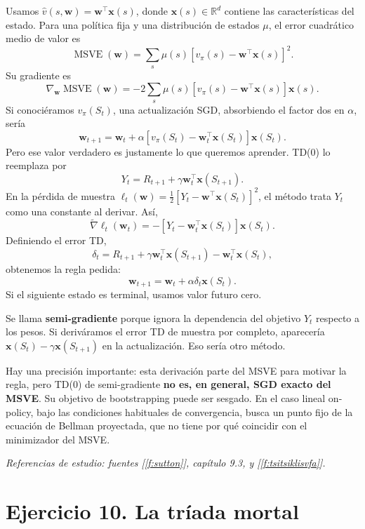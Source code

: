 \documentclass[11pt,a4paper]{article}
\newcommand{\R}{\mathbb{R}}
\begin{document}
Usamos $\widehat v(s,\mathbf w)=\mathbf w^\top\mathbf x(s)$, donde $\mathbf x(s)\in\R^d$ contiene las características del estado. Para una política fija y una distribución de estados $\mu$, el error cuadrático medio de valor es
\[
\operatorname{MSVE}(\mathbf w)=\sum_s\mu(s)
[v_\pi(s)-\mathbf w^\top\mathbf x(s)]^2.
\]
Su gradiente es
\[
\nabla_{\mathbf w}\operatorname{MSVE}(\mathbf w)
=-2\sum_s\mu(s)[v_\pi(s)-\mathbf w^\top\mathbf x(s)]\mathbf x(s).
\]
Si conociéramos $v_\pi(S_t)$, una actualización SGD, absorbiendo el factor dos en $\alpha$, sería
\[
\mathbf w_{t+1}=\mathbf w_t+\alpha
[v_\pi(S_t)-\mathbf w_t^\top\mathbf x(S_t)]\mathbf x(S_t).
\]
Pero ese valor verdadero es justamente lo que queremos aprender. TD(0) lo reemplaza por
\[
Y_t=R_{t+1}+\gamma\mathbf w_t^\top\mathbf x(S_{t+1}).
\]
En la pérdida de muestra $\ell_t(\mathbf w)=\tfrac12[Y_t-\mathbf w^\top\mathbf x(S_t)]^2$, el método trata $Y_t$ como una constante al derivar. Así,
\[
\widetilde\nabla\ell_t(\mathbf w_t)
=-[Y_t-\mathbf w_t^\top\mathbf x(S_t)]\mathbf x(S_t).
\]
Definiendo el error TD,
\[
\delta_t=R_{t+1}+\gamma\mathbf w_t^\top\mathbf x(S_{t+1})
-\mathbf w_t^\top\mathbf x(S_t),
\]
obtenemos la regla pedida:
\[
\boxed{\mathbf w_{t+1}=\mathbf w_t+\alpha\delta_t\mathbf x(S_t).}
\]
Si el siguiente estado es terminal, usamos valor futuro cero.

Se llama \textbf{semi-gradiente} porque ignora la dependencia del objetivo $Y_t$ respecto a los pesos. Si deriváramos el error TD de muestra por completo, aparecería $\mathbf x(S_t)-\gamma\mathbf x(S_{t+1})$ en la actualización. Eso sería otro método.

Hay una precisión importante: esta derivación parte del MSVE para motivar la regla, pero TD(0) de semi-gradiente \textbf{no es, en general, SGD exacto del MSVE}. Su objetivo de bootstrapping puede ser sesgado. En el caso lineal on-policy, bajo las condiciones habituales de convergencia, busca un punto fijo de la ecuación de Bellman proyectada, que no tiene por qué coincidir con el minimizador del MSVE.

\textit{Referencias de estudio: fuentes [\ref{f:sutton}], capítulo 9.3, y [\ref{f:tsitsiklisvfa}].}

\section{Ejercicio 10. La tríada mortal}
\end{document}
